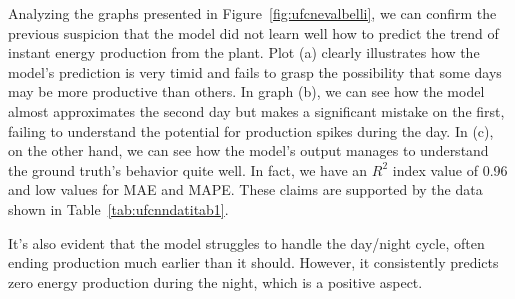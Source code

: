 Analyzing the graphs presented in Figure~\ref{fig:ufcnevalbelli},
we can confirm the previous suspicion that the model did not learn well how
to predict the trend of instant energy production from the plant.
Plot (a) clearly illustrates how the model's prediction is very timid
and fails to grasp the possibility that some days may be more productive
than others.
In graph (b), we can see how the model almost approximates the second
day but makes a significant mistake on the first,
failing to understand the potential for production spikes during the day. In (c), on the other hand, we can see
how the model's output manages to understand the
ground truth's behavior quite well. In fact,
we have an $R^2$ index value of 0.96 and low values for MAE and MAPE. These claims are supported by the data shown in Table~\ref{tab:ufcnndatitab1}.

It's also evident that the model struggles to handle the
day/night cycle, often ending production much earlier than it should.
However, it consistently predicts zero energy production
during the night, which is a positive aspect.


